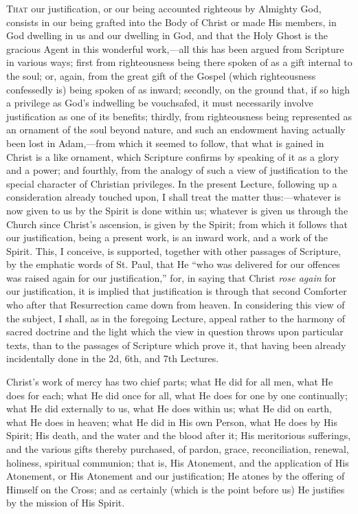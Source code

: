 T\textsc{hat} our justification, or our being accounted righteous by
Almighty God, consists in our being grafted into the Body of Christ or
made His members, in God dwelling in us and our dwelling in God, and
that the Holy Ghost is the gracious Agent in this wonderful work,—all
this has been argued from Scripture in various ways; first from
righteousness being there spoken of as a gift internal to the soul;
or, again, from the great gift of the Gospel (which righteousness
confessedly is) being spoken of as inward; secondly, on the ground
that, if so high a privilege as God's indwelling be vouchsafed, it
must necessarily involve justification as one of its benefits;
thirdly, from righteousness being represented as an ornament of the
soul beyond nature, and such an endowment having actually been lost in
Adam,—from which it seemed to follow, that what is gained in Christ
is a like ornament, which Scripture confirms by speaking of it as a
glory and a power; and fourthly, from the analogy of such a view of
justification to the special character of Christian privileges. In the
present Lecture, following up a consideration already touched upon, I
shall treat the matter thus:—whatever is now given to us by
the Spirit is done within us; whatever is given us through the Church
since Christ's ascension, is given by the Spirit; from which it
follows that our justification, being a present work, is an inward
work, and a work of the Spirit. This, I conceive, is supported,
together with other passages of Scripture, by the emphatic words of
St. Paul, that He ``who was delivered for our offences was raised
again for our justification,'' for, in saying that Christ \emph{rose
again} for our justification, it is implied that justification is
through that second Comforter who after that Resurrection came down
from heaven. In considering this view of the subject, I shall, as in
the foregoing Lecture, appeal rather to the harmony of sacred doctrine
and the light which the view in question throws upon particular texts,
than to the passages of Scripture which prove it, that having been
already incidentally done in the 2d, 6th, and 7th Lectures.

Christ's work of mercy has two chief parts; what He did for all
men, what He does for each; what He did once for all, what He does for
one by one continually; what He did externally to us, what He does
within us; what He did on earth, what He does in heaven; what He did
in His own Person, what He does by His Spirit; His death, and the
water and the blood after it; His meritorious sufferings, and the
various gifts thereby purchased, of pardon, grace, reconciliation,
renewal, holiness, spiritual communion; that is, His Atonement, and
the application of His Atonement, or His Atonement and our
justification; He atones by the offering of Himself on the Cross; and
as certainly (which is the point before us) He justifies by the
mission of His Spirit.


